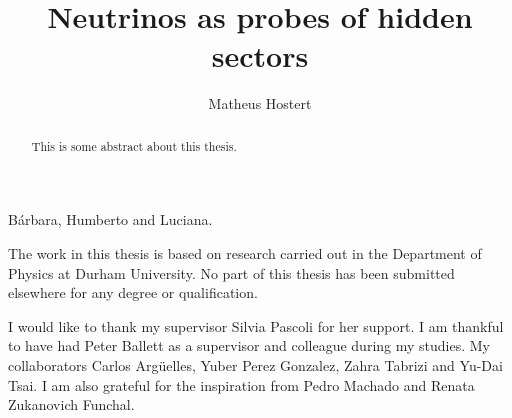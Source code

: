 \documentclass[openany,twoside,frontopenright]{ip3thesis}
\begin{document}
\title{Neutrinos as probes of hidden sectors}
\subtitle{}
\author{Matheus Hostert}
\maketitlepage*

\begin{abstract}
%
	This is some abstract about this thesis.
%
\end{abstract}


\begin{dedication*}
%
B\'arbara, Humberto and Luciana.
%
\end{dedication*}

\disableprotrusion
\tableofcontents*
\listoffigures
\listoftables
\enableprotrusion

\begin{declaration*}
%
	The work in this thesis is based on research carried out in the Department of
	Physics at Durham University. No part of this thesis has been
	submitted elsewhere for any degree or qualification.
%
\end{declaration*}

\begin{acknowledgements*}
%
	I would like to thank my supervisor Silvia Pascoli for her support. I am thankful to have had Peter Ballett as a supervisor and colleague during my studies.
	My collaborators Carlos Arg\"uelles, Yuber Perez Gonzalez, Zahra Tabrizi and Yu-Dai Tsai. I am also grateful for the inspiration from  Pedro Machado and Renata Zukanovich Funchal.
\end{acknowledgements*}



\cleardoublepage

\begin{epigraph*}
% 
% 
\end{epigraph*}
\end{document}
